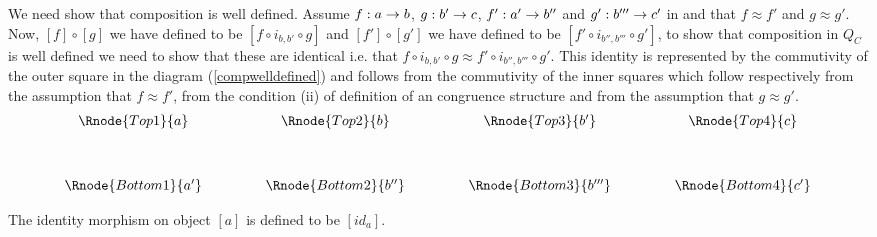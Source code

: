 \documentclass[10pt,a4paper]{article}
\theoremstyle{remark}
\begin{document}
We need show that composition is well defined.  Assume $f:a \rightarrow b$, $g: b' \rightarrow c$, $f':a' \rightarrow b''$ and $g': b''' \rightarrow c'$ in \catcw and that
$f \approx f'$ and $g \approx g'$.
Now,  
$[f] \circ [g]$ we have defined to be $[f \circ i_{b,b'} \circ g]$  and $[f']  \circ [g']$ we have defined to be $[f' \circ i_{b'',b'''} \circ g']$,
to show that composition in $Q_C$ is well defined we need to show that these are identical i.e. that $f \circ i_{b,b'} \circ g \approx f' \circ i_{b'',b'''} \circ g'$. This identity
is represented by the commutivity of the outer square in the diagram (\ref{compwelldefined}) and follows from the commutivity of the inner squares which follow respectively from the assumption that $f \approx f'$,
from the condition (ii) of definition of an congruence structure and from the assumption that $g \approx g'$.
\begin{equation}
\label{compwelldefined}
\begin{array}{cp{.9cm}cp{.9cm}cp{.9cm}c}
\Rnode{Top1}{a} & & \Rnode{Top2}{b}  & & \Rnode{Top3}{b'} && \Rnode{Top4}{c}\\ [1.2cm]
\Rnode{Bottom1}{a'} & & \Rnode{Bottom2}{b''}  & & \Rnode{Bottom3}{b'''} && \Rnode{Bottom4}{c'}
\end{array}
\end{equation}

The identity morphism on object $[a]$ is defined to be $[id_a]$.
\end{document}

